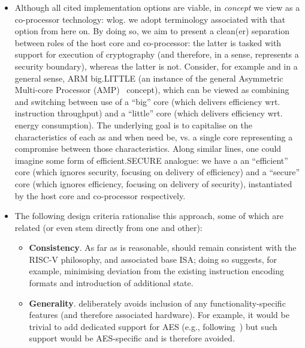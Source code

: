 \begin{itemize}
\item Although all cited implementation options are viable, in {\em concept}
      we view \ISE as a co-processor technology: wlog. we adopt terminology 
      associated with that option from here on.
      By doing so, we aim to present a clean(er) separation between roles of
      the host core and \ISE co-processor: the latter is tasked with support
      for execution of cryptography (and therefore, in a sense, represents a 
      security boundary), whereas the latter is not.
      Consider, for example and in a general sense, ARM {\sf big.LITTLE}
      (an instance of the general Asymmetric Multi-core Processor (AMP)~\cite{SCARV:Mittal:16} concept),
      which can be viewed as combining and switching between
      use of
      a ``big''    core (which delivers efficiency wrt. instruction throughput)
      and 
      a ``little'' core (which delivers efficiency wrt. energy consumption).
      The underlying goal is to capitalise on the characteristics of each as 
      and when need be, vs. a single core representing a compromise between 
      those characteristics.  Along similar lines, one could imagine some
      form of {\sf efficient.SECURE} analogue: we have a 
      an ``efficient'' core (which ignores   security, focusing on delivery of efficiency)
      and
      a  ``secure''    core (which ignores efficiency, focusing on delivery of   security),
      instantiated by the host core and \ISE co-processor respectively.

\item The following design criteria rationalise this approach, some of which
      are related (or even stem directly from one and other):

      \begin{itemize}
      \item {\bf      Consistency}.
            As far as is reasonable, \ISE should remain consistent with the
            RISC-V philosophy, and associated base ISA; doing so suggests,
            for example, minimising deviation from the existing instruction
            encoding formats and introduction of additional state.

      \item {\bf       Generality}.
            \ISE deliberately avoids inclusion of any functionality-specific 
            features (and therefore associated hardware).  For example, it
            would be trivial to add dedicated support for AES
            (e.g., following~\cite{SCARV:TilGro:06})
            but such support would be AES-specific and is therefore avoided.


\end{itemize}
\end{itemize}
